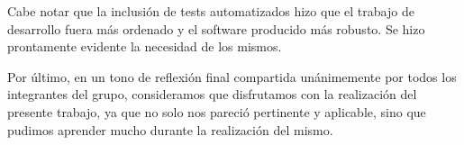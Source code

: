 \documentclass[11pt]{article}
\begin{document}
Cabe notar que la inclusión de tests automatizados hizo que el trabajo de desarrollo fuera más ordenado y el software producido más robusto. Se hizo prontamente evidente la necesidad de los mismos.

Por último, en un tono de reflexión final compartida unánimemente por todos los integrantes del grupo, consideramos que disfrutamos con la realización del presente trabajo, ya que no solo nos pareció pertinente y aplicable, sino que pudimos aprender mucho durante la realización del mismo.


\printbibliography

\end{document}
